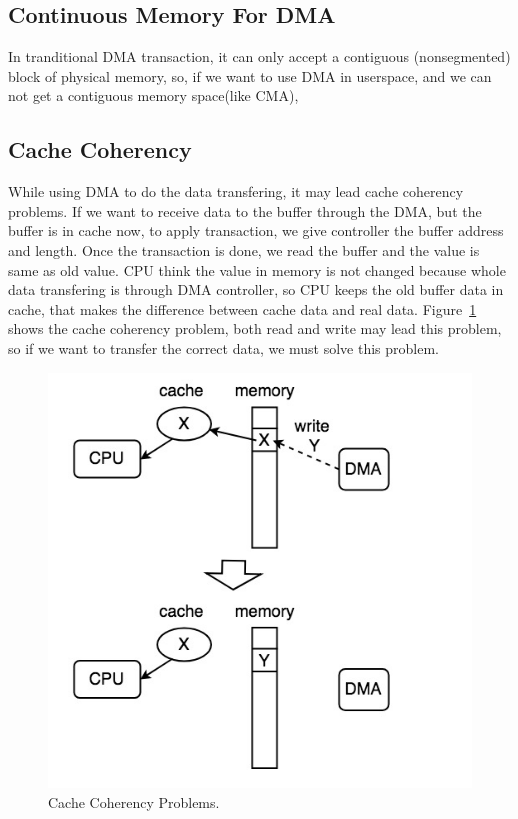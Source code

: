 \subsection{Continuous Memory For DMA}
\label{subsec:Continuous Memory For DMA}
In tranditional DMA transaction, it can only accept a contiguous (nonsegmented) block of
physical memory, so, if we want to use DMA in userspace, and we can not get a contiguous 
memory space(like CMA), 




\subsection{Cache Coherency}
\label{subsec:Cache Coherency}
While using DMA to do the data transfering, it may lead cache coherency problems. If we want to receive data to the buffer through the DMA, but the buffer is in cache now, to apply transaction, we give controller the buffer address and length. Once the transaction is done, we read the buffer and the value is same as old value. CPU think the value in memory is not changed because whole data transfering is through DMA controller, so CPU keeps the old buffer data in cache, that makes the difference between cache data and real data. Figure~\ref{fig:Cache Coherency Problems.} shows the cache coherency problem, both read and write may lead this problem, so if we want to transfer the correct data, we must solve this problem.
\begin{figure}[!htb]
  \centering
  \includegraphics[scale=0.5]{images/cache_coherency.jpg}
  \caption[Cache Coherency Problems.]{Cache Coherency Problems.}
  \label{fig:Cache Coherency Problems.}
\end{figure}
